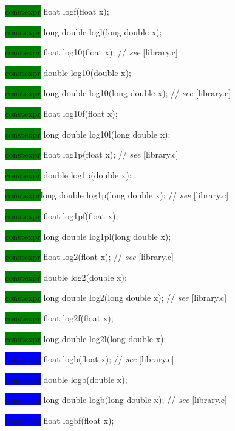 \documentclass[prd,twocolumn,amsmath,amssymb,nofootinbib,eqsecnum]{revtex4-1}
\newcommand{\highlight}[1]{\colorbox{green}{\!\!\!\! #1}}
\newcommand{\oldhighlight}[1]{\colorbox{blue}{\!\!\!\! #1}}
\newcommand{\stdcomment}[1]{{// {\it see} [#1]}}
\begin{document}
{\highlight{constexpr} float logf(float x);

\highlight{constexpr} long double logl(long double x);

\vspace{2ex}


\highlight{constexpr} float log10(float x); \stdcomment{library.c}

\highlight{constexpr} double log10(double x);

\highlight{constexpr} long double log10(long double x); \stdcomment{library.c}

\highlight{constexpr} float log10f(float x);

\highlight{constexpr} long double log10l(long double x);

\vspace{2ex}


\highlight{constexpr} float log1p(float x); \stdcomment{library.c}

\highlight{constexpr} double log1p(double x);

\highlight{constexpr}long double log1p(long double x); \stdcomment{library.c}

\highlight{constexpr} float log1pf(float x);

\highlight{constexpr} long double log1pl(long double x);

\vspace{2ex}


\highlight{constexpr} float log2(float x); \stdcomment{library.c}

\highlight{constexpr} double log2(double x);

\highlight{constexpr} long double log2(long double x); \stdcomment{library.c}

\highlight{constexpr} float log2f(float x);

\highlight{constexpr} long double log2l(long double x);

\vspace{2ex}


\oldhighlight{constexpr} float logb(float x); \stdcomment{library.c}

\oldhighlight{constexpr} double logb(double x);

\oldhighlight{constexpr} long double logb(long double x); \stdcomment{library.c}

\oldhighlight{constexpr} float logbf(float x);

}
\end{document}
